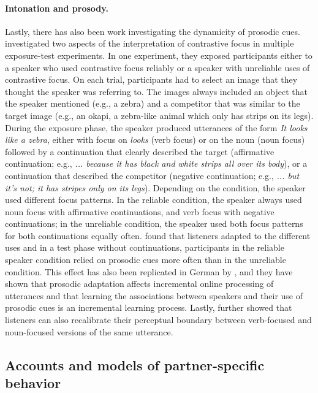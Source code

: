 \paragraph{Intonation and prosody.} Lastly, there has also been work investigating the dynamicity of prosodic cues. 
\textcite{Kurumada2012} investigated two aspects of the interpretation of contrastive focus in multiple exposure-test experiments. 
In one experiment, they exposed participants either to a speaker who used contrastive focus reliably or a speaker with unreliable
uses of contrastive focus. On each trial, participants had to select an image that they thought the speaker was referring to. The images
always included an object that the speaker mentioned (e.g., a zebra) and a competitor that was similar to the target image (e.g., an okapi,
a zebra-like animal which only has strips on its legs). During the exposure phase, the speaker produced utterances of the form \textit{It looks like a zebra}, either
with focus on \textit{looks} (verb focus) or on the noun (noun focus) followed by a continuation that clearly described the target (affirmative continuation; e.g., \textit{... because it has black and white strips all over its body}),
or a continuation that described the competitor (negative continuation; e.g., \textit{... but it's not; it has stripes only on its legs}). Depending on the condition, 
the speaker used different focus patterns. In the reliable condition, the speaker always used noun focus with affirmative continuations, and verb focus with
negative continuations; in the unreliable condition, the speaker used both focus patterns for both continuations equally often. \textcite{Kurumada2012} found
that listeners adapted to the different uses and in a test phase without continuations, participants in the reliable speaker condition relied on prosodic cues more
often than in the unreliable condition. This effect has also been replicated in German by \textcite{Roettger2019}, and they have shown that prosodic adaptation
affects incremental online processing of utterances and that learning the associations between speakers and their use of prosodic cues is an incremental learning process.
Lastly, \textcite{Kurumada2012} further showed that listeners can also recalibrate their perceptual boundary between verb-focused and noun-focused
versions of the same utterance.

\subsection{Accounts and models of partner-specific behavior}


